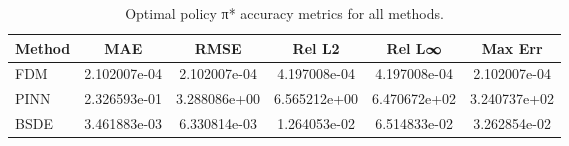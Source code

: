 \begin{table}[ht]
\centering
\caption{Optimal policy π* accuracy metrics for all methods.}
\label{tab:policy_accuracy}
\begin{tabular}{lccccc}
\toprule
Method & MAE & RMSE & Rel L2 & Rel L∞ & Max Err \\
\midrule
FDM & 2.102007e-04 & 2.102007e-04 & 4.197008e-04 & 4.197008e-04 & 2.102007e-04 \\
PINN & 2.326593e-01 & 3.288086e+00 & 6.565212e+00 & 6.470672e+02 & 3.240737e+02 \\
BSDE & 3.461883e-03 & 6.330814e-03 & 1.264053e-02 & 6.514833e-02 & 3.262854e-02 \\
\bottomrule
\end{tabular}
\end{table}